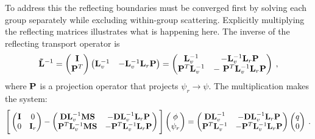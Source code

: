 To address this the reflecting boundaries must be converged first by solving each group separately while excluding within-group scattering. Explicitly multiplying the reflecting matrices illustrates what is happening here. The inverse of the reflecting transport operator is
%
\begin{alignat}{3}
 \ve{\tilde{L}}^{-1} = \begin{pmatrix} \ve{I} \\ \ve{P}^{T} \end{pmatrix}
 \begin{pmatrix} \ve{L}_{v}^{-1} & -\ve{L}_{v}^{-1} \ve{L}_{r} \ve{P} \end{pmatrix}
 =
 \begin{pmatrix} \ve{L}_{v}^{-1} & -\ve{L}_{v}^{-1} \ve{L}_{r} \ve{P} \\
                   \ve{P}^{T}\ve{L}_{v}^{-1} & -\ \ve{P}^{T}\ve{L}_{v}^{-1} \ve{L}_{r} \ve{P} \end{pmatrix}  \:,
\label{eq:reflInverse}
\end{alignat} 
%
where $\mathbf{P}$ is a projection operator that projects $\psi_{r} \to \psi$. The multiplication makes the system:
%
\begin{equation}
  \Bigg[ \begin{pmatrix} \mathbf{I} & 0 \\ 0 & \mathbf{I}_{r} \end{pmatrix} - 
  \begin{pmatrix} \mathbf{DL}_{v}^{-1}\mathbf{MS} & -\mathbf{DL}_{v}^{-1}\mathbf{L}_{r}\mathbf{P} \\
                      \mathbf{P}^{T}\mathbf{L}_{v}^{-1}\mathbf{MS} & - \mathbf{P}^{T}\mathbf{L}_{v}^{-1} \mathbf{L}_{r} \mathbf{P} \end{pmatrix} \Bigg]
  \begin{pmatrix} \phi \\ \psi_{r} \end{pmatrix}
  =
  \begin{pmatrix} \mathbf{DL}_{v}^{-1} & -\mathbf{DL}_{v}^{-1}\mathbf{L}_{r}\mathbf{P} \\
                     \mathbf{P}^{T}\mathbf{L}_{v}^{-1} & - \mathbf{P}^{T}\mathbf{L}_{v}^{-1} \mathbf{L}_{r} \mathbf{P} \end{pmatrix}
  \begin{pmatrix} q \\ 0 \end{pmatrix} \:.
\label{eq:explicitBlocks}
\end{equation}
% 

